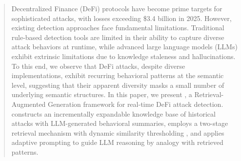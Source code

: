 
\begin{abstract}
Decentralized Finance (DeFi) protocols have become prime targets for sophisticated attacks, with losses exceeding \$3.4 billion in 2025. However, existing detection approaches face fundamental limitations. Traditional rule-based detection tools are limited in their ability to capture diverse attack behaviors at runtime, while advanced large language models (LLMs) exhibit extrinsic limitations due to knowledge staleness and hallucinations. To this end, we observe that DeFi attacks, despite diverse implementations, exhibit recurring behavioral patterns at the semantic level, suggesting that their apparent diversity masks a small number of underlying semantic structures. In this paper, we present \approach, a Retrieval-Augmented Generation framework for real-time DeFi attack detection. \approach constructs an incrementally expandable knowledge base of historical attacks with LLM-generated behavioral summaries, employs a two-stage retrieval mechanism with dynamic similarity thresholding , and applies adaptive prompting to guide LLM reasoning by analogy with retrieved patterns. 

\end{abstract}
